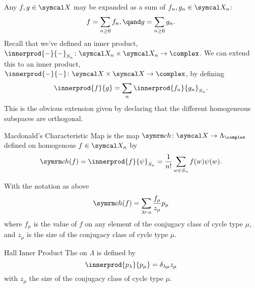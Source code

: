 Any \(f, g \in \classFunctions\) may be expanded as a sum of \(f_n, g_n \in \classFunctions_n\):
\begin{equation}
    f = \sum_{n \ge 0} f_n, \qand g = \sum_{n \ge 0} g_n.
\end{equation}
Recall that we've defined an inner product, \(\innerprod{-}{-}_{S_n} \colon \classFunctions_n \times \classFunctions_n \to \complex\).
We can extend this to an inner product, \(\innerprod{-}{-} \colon \classFunctions \times \classFunctions \to \complex\), by defining
\begin{equation}
    \innerprod{f}{g} = \sum_n \innerprod{f_n}{g_n}_{S_n}.
\end{equation}
This is the obvious extension given by declaring that the different homogeneous subspaces are orthogonal.

\begin{dfn}{Macdonald's Characteristic Map}{}
     is the map \(\ch \colon \classFunctions \to \Lambda_{\complex}\) defined on homogenous \(f \in \classFunctions_n\) by
    \begin{equation}
        \ch(f) = \innerprod{f}{\psi}_{S_n} = \frac{1}{n!} \sum_{w \in S_n} f(w)\psi(w).
    \end{equation}
\end{dfn}

\begin{lma}{}{}
    With the notation as above
    \begin{equation}
        \ch(f) = \sum_{\lambda \partition n} \frac{f_\mu}{z_\mu} p_\mu
    \end{equation}
    where \(f_\mu\) is the value of \(f\) on any element of the conjugacy class of cycle type \(\mu\), and \(z_\mu\) is the size of the conjugacy class of cycle type \(\mu\).
\end{lma}

\begin{dfn}{Hall Inner Product}{}
    The  on \(\Lambda\) is defined by
    \begin{equation}
        \innerprod{p_\lambda}{p_\mu} = \delta_{\lambda\mu} z_\mu
    \end{equation}
    with \(z_\mu\) the size of the conjugacy class of cycle type \(\mu\).
\end{dfn}

